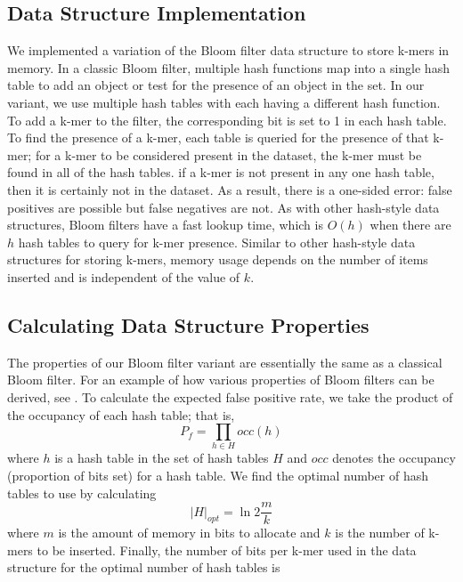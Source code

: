 \documentclass[12pt]{article} \usepackage{simplemargins}
\begin{document}
\subsection{Data Structure Implementation}
We implemented a variation of the Bloom filter data structure to store k-mers
in memory. In a classic Bloom filter, multiple hash functions map into 
a single hash table to add an object or test for the presence of an object 
in the set. In 
our variant, we use multiple hash tables with each having a different hash function. 
To add a k-mer to the filter, the corresponding bit is set to 1 
in each hash table.  
To find the presence of a k-mer, each table is queried for the
presence of that k-mer; for a k-mer to be considered 
present in the dataset, 
the k-mer must be found in all of the hash tables.  
if a k-mer is not present in any one hash table, then it is certainly 
not in the dataset. As a result, there is a one-sided error:  
false positives are possible but false negatives are not. As with other 
hash-style data structures, Bloom filters have a
fast lookup time, which is $O(h)$ when there are $h$ hash tables to query
for k-mer presence. Similar to other hash-style data structures for 
storing k-mers, memory usage depends on the number of items inserted 
and is independent of the value of $k$. 

\subsection{Calculating Data Structure Properties}
The properties of our Bloom filter variant are essentially the
same as a classical Bloom filter. For an example of how various 
properties of Bloom filters can be derived, see \cite{bloomsurvey}. 
To calculate the expected false positive 
rate, we
take the product of the occupancy of each hash table; that is,
\begin{displaymath}
P_f = \prod_{h \in H} occ(h)
\end{displaymath}
where $h$ is a hash table in the set of hash tables $H$ and $occ$ denotes
the occupancy (proportion of bits set) for a hash table.
We find the optimal number of hash tables
to use by calculating
\begin{displaymath}
\vert H \vert_{opt} = \ln 2 \frac{m}{k}
\end{displaymath}
where $m$ is the amount of memory in bits to allocate and $k$
is the number of k-mers to be inserted. Finally,
the number of bits per
k-mer used in the data structure for the optimal number of hash 
tables is
\end{document}
